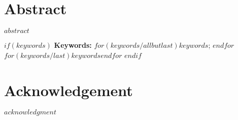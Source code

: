 

\cleardoublepage

\pagestyle{plain}				%
\declaration
\cleardoublepage

\chapter*{Abstract}
\label{sec:abstract}
\vspace*{-10mm}

$abstract$

$if(keywords)$
\textbf{Keywords: } $for(keywords/allbutlast)$$keywords$; $endfor$$for(keywords/last)$$keywords$$endfor$
$endif$
\cleardoublepage

\chapter*{Acknowledgement}
\label{sec:acknowledgement}
\vspace*{-10mm}

$acknowledgment$
\cleardoublepage

\setcounter{tocdepth}{2}		%
\tableofcontents				%
\cleardoublepage

\listoffigures
\cleardoublepage

\listoftables
\cleardoublepage

\setcounter{page}{1}			%
\pagestyle{maincontentstyle} 	%
